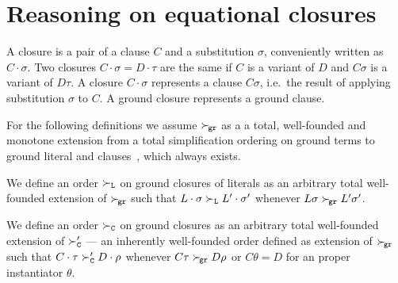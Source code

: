 \section{Reasoning on equational closures}\label{sec:reasoning:on:equational closures}

\begin{definition}
    A closure is a pair of a clause \( C \) and a substitution \( \sigma \),
    conveniently written as \( C\cdot\sigma \). Two closures \( C\cdot\sigma = D\cdot\tau \)
    are the same if \( C \) is a variant of \( D \) and \( C\sigma \) is a variant of \( D\tau \).
    A closure \( C\cdot\sigma \) represents a clause \( C\sigma \),
    i.e.~the result of applying substitution \( \sigma \) to \( C \).
    A ground closure represents a ground clause.
\end{definition}

For the following definitions we assume
\( \mathrel\succ_{\!\mathtt{gr}} \) as a a total, well-founded and monotone extension
from a total simplification ordering on ground terms
to ground literal and clauses~\cite{NR2001},
which always exists.


\begin{definition}
    We define an order \( \mathrel\succ_{\mathtt{L}} \) on ground closures of literals
    as an arbitrary total well-founded extension of \( \mathrel\succ_{\!\mathtt{gr}} \)
    such that
    \( L\cdot\sigma\mathrel\succ_{\mathtt{L}} L'\cdot\sigma' \) whenever
    \( L\sigma\mathrel\succ_{\!\mathtt{gr}} L'\sigma' \).

    We define an order \( \mathrel\succ_{\mathtt{C}} \) on ground closures
    as an arbitrary total well-founded extension of
    \( \mathrel\succ_{\mathtt{C}}' \) --- an inherently well-founded order defined as extension of \( \mathrel\succ_{\!\mathtt{gr}} \)
    such that
    \( C\cdot\tau\mathrel\succ_{\mathtt{C}}' D\cdot\rho \) whenever
    \( C\tau\mathrel\succ_{\!\mathtt{gr}} D\rho \) or \( C\theta = D \) for an proper instantiator \( \theta \).
\end{definition}

